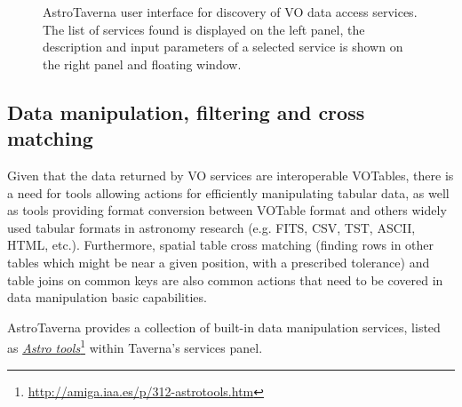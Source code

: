 \documentclass[final,authoryear,5p,times,twocolumn]{elsarticle}
\newcommand{\urlsamefont}[1]{\urlstyle{same}\url{#1}}
\newcommand{\hrefnote}[2]{\href{#1}{#2}\footnote{\urlsamefont{#1}}}
\begin{document}
\begin{figure}[tb]
\centering 
{}
\caption{AstroTaverna user interface for discovery of VO data access services. The list of services found is displayed on the left panel, the description and input parameters of a selected service is shown on the right panel and floating window.}
\label{fig:VODiscovery}
\end{figure}

\subsection{Data manipulation, filtering and cross matching}
\label{DataManipulation}

Given that the data returned by VO services are interoperable VOTables, there is a need for tools allowing actions for efficiently manipulating tabular data, as well as tools providing format conversion between VOTable format and others widely used tabular formats in astronomy research (e.g. FITS, CSV, TST, ASCII, HTML, etc.). Furthermore, spatial table cross matching (finding rows in other tables which might be near a given position, with a prescribed tolerance) and table joins on common keys are also common actions that need to be covered in data manipulation basic capabilities.

AstroTaverna provides a collection of built-in data manipulation services, listed as \hrefnote{http://amiga.iaa.es/p/312-astrotools.htm}{\textit{Astro tools}} within Taverna's services panel.
\end{document}
